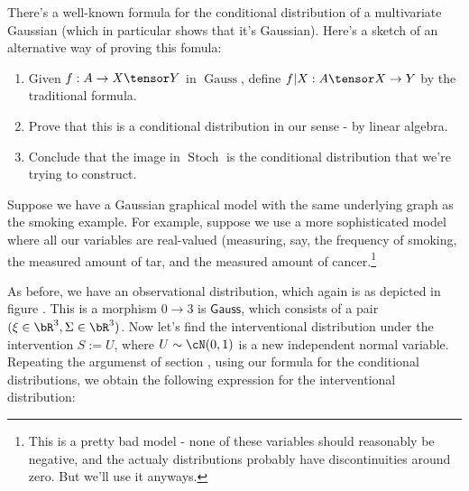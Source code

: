 \documentclass{article}
\DeclareMathOperator{\Stoch}{Stoch}
\DeclareMathOperator{\Gauss}{Gauss}
\begin{document}
\begin{example}
    There's a well-known formula for the conditional distribution of a multivariate Gaussian (which in particular shows that it's Gaussian).
    Here's a sketch of an alternative way of proving this fomula:
    \begin{enumerate}
        \item Given $f: A \to X \tensor Y$ in $\Gauss$, define $f|X: A \tensor X \to Y$ by the traditional formula.
        \item Prove that this is a conditional distribution in our sense - by linear algebra.
        \item Conclude that the image in $\Stoch$ is the conditional distribution that we're trying to construct.
    \end{enumerate}
\end{example}

\begin{example}
    Suppose we have a Gaussian graphical model with the same underlying graph as the smoking example.
    For example, suppose we use a more sophisticated model where all our variables are real-valued (measuring, say, the frequency of smoking, the measured amount of tar, and the measured amount of cancer.\footnote{This is a pretty bad model - none of these variables should reasonably be negative, and the actualy distributions probably have discontinuities around zero. But we'll use it anyways.}

    As before, we have an observational distribution, which again is as depicted in figure .
    This is a morphism $0 \to 3$ is $\mathsf{Gauss}$, which consists of a pair $(\xi \in \bR^3, \Sigma \in \bR^{3\time 3})$.
    Now let's find the interventional distribution under the intervention $S := U$, where $U \sim \cN(0,1)$ is a new independent normal variable.
    Repeating the argumenst of section , using our formula for the conditional distributions, we obtain the following expression for the interventional distribution:
\end{example}
\end{document}
